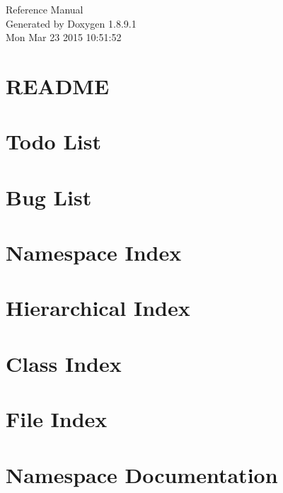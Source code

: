 \documentclass[twoside]{book}
\newcommand{\+}{\discretionary{\mbox{\scriptsize$\hookleftarrow$}}{}{}}
\newcommand{\clearemptydoublepage}{%
  \newpage{\pagestyle{empty}\cleardoublepage}%
}
\begin{document}
\hypersetup{pageanchor=false,
             bookmarks=true,
             bookmarksnumbered=true,
             pdfencoding=unicode
            }
\begin{titlepage}
\vspace*{7cm}
\begin{center}%
{\Large Reference Manual}\\
\vspace*{1cm}
{\large Generated by Doxygen 1.8.9.1}\\
\vspace*{0.5cm}
{\small Mon Mar 23 2015 10:51:52}\\
\end{center}
\end{titlepage}
\clearemptydoublepage
\tableofcontents
\clearemptydoublepage
{}
\hypersetup{pageanchor=true}

\chapter{R\+E\+A\+D\+M\+E}
\label{md_README}
\hypertarget{md_README}{}

\chapter{Todo List}
\label{todo}
\hypertarget{todo}{}

\chapter{Bug List}
\label{bug}
\hypertarget{bug}{}

\chapter{Namespace Index}

\chapter{Hierarchical Index}

\chapter{Class Index}

\chapter{File Index}

\chapter{Namespace Documentation}


\end{document}
